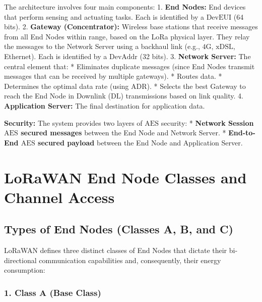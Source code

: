 \documentclass[a4paper, 12pt]{book} %
\begin{document}
The architecture involves four main components: 1. \textbf{End Nodes:}
End devices that perform sensing and actuating tasks. Each is identified
by a \(\text{DevEUI}\) (64 bits). 2. \textbf{Gateway (Concentrator):}
Wireless base stations that receive messages from all End Nodes within
range, based on the LoRa physical layer. They relay the messages to the
Network Server using a backhaul link (e.g., \(4\text{G}\),
\(\text{xDSL}\), Ethernet). Each is identified by a \(\text{DevAddr}\)
(32 bits). 3. \textbf{Network Server:} The central element that: *
Eliminates duplicate messages (since End Nodes transmit messages that
can be received by multiple gateways). * Routes data. * Determines the
optimal data rate (using \(\text{ADR}\)). * Selects the best Gateway to
reach the End Node in Downlink (\(\text{DL}\)) transmissions based on
link quality. 4. \textbf{Application Server:} The final destination for
application data.

\textbf{Security:} The system provides two layers of \(\text{AES}\)
security: * \textbf{Network Session \(\text{AES}\) secured messages}
between the End Node and Network Server. * \textbf{End-to-End
\(\text{AES}\) secured payload} between the End Node and Application
Server.

\chapter{LoRaWAN End Node Classes and Channel
Access}\label{lorawan-end-node-classes-and-channel-access}

\section{Types of End Nodes (Classes A, B, and
C)}\label{types-of-end-nodes-classes-a-b-and-c}

LoRaWAN defines three distinct classes of End Nodes that dictate their
bi-directional communication capabilities and, consequently, their
energy consumption:

\subsection{1. Class A (Base Class)}\label{class-a-base-class}
\end{document}
